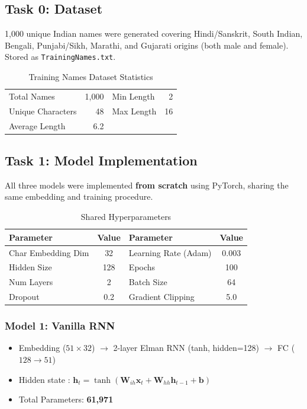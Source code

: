 \documentclass[11pt,a4paper]{article}
\begin{document}
\subsection{Task 0: Dataset}

1,000 unique Indian names were generated covering Hindi/Sanskrit, South Indian, Bengali, Punjabi/Sikh, Marathi, and Gujarati origins (both male and female). Stored as \texttt{TrainingNames.txt}.

\begin{table}[H]
\centering
\caption{Training Names Dataset Statistics}
\vspace{-0.5em}
\begin{tabular}{lrlr}
\toprule
Total Names & 1,000 & Min Length & 2 \\
Unique Characters & 48 & Max Length & 16 \\
Average Length & 6.2 & & \\
\bottomrule
\end{tabular}
\end{table}

\subsection{Task 1: Model Implementation}

All three models were implemented \textbf{from scratch} using PyTorch, sharing the same embedding and training procedure.

\begin{table}[H]
\centering
\caption{Shared Hyperparameters}
\vspace{-0.5em}
\begin{tabular}{lclc}
\toprule
\textbf{Parameter} & \textbf{Value} & \textbf{Parameter} & \textbf{Value} \\
\midrule
Char Embedding Dim & 32 & Learning Rate (Adam) & 0.003 \\
Hidden Size & 128 & Epochs & 100 \\
Num Layers & 2 & Batch Size & 64 \\
Dropout & 0.2 & Gradient Clipping & 5.0 \\
\bottomrule
\end{tabular}
\end{table}

\subsubsection{Model 1: Vanilla RNN}
\begin{itemize}
    \item Embedding ($51 \times 32$) $\rightarrow$ 2-layer Elman RNN (tanh, hidden=128) $\rightarrow$ FC ($128 \rightarrow 51$)
    \item Hidden state \cite{elman1990rnn}: $\mathbf{h}_t = \tanh(\mathbf{W}_{ih}\mathbf{x}_t + \mathbf{W}_{hh}\mathbf{h}_{t-1} + \mathbf{b})$
    \item Total Parameters: \textbf{61,971}
\end{itemize}
\end{document}
